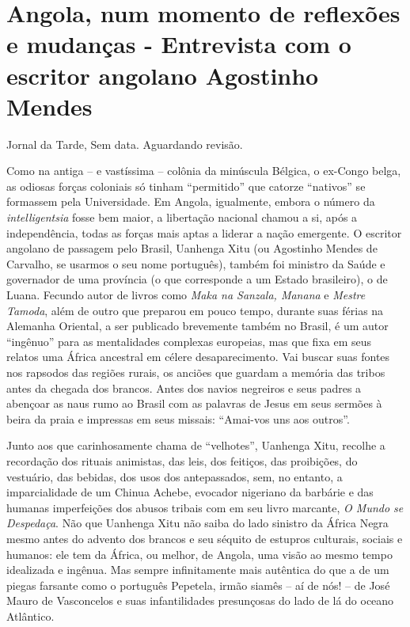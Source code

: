 \documentclass[
  letterpaper,
  DIV=11,
  numbers=noendperiod]{scrreprt}
\begin{document}
\chapter{Angola, num momento de reflexões e mudanças - Entrevista com o
escritor angolano Agostinho
Mendes}\label{angola-num-momento-de-reflexuxf5es-e-mudanuxe7as---entrevista-com-o-escritor-angolano-agostinho-mendes}

Jornal da Tarde, Sem data. Aguardando revisão.

\hfill\break

Como na antiga -- e vastíssima -- colônia da minúscula Bélgica, o
ex-Congo belga, as odiosas forças coloniais só tinham ``permitido'' que
catorze ``nativos'' se formassem pela Universidade. Em Angola,
igualmente, embora o número da \emph{intelligentsia} fosse bem maior, a
libertação nacional chamou a si, após a independência, todas as forças
mais aptas a liderar a nação emergente. O escritor angolano de passagem
pelo Brasil, Uanhenga Xitu (ou Agostinho Mendes de Carvalho, se usarmos
o seu nome português), também foi ministro da Saúde e governador de uma
província (o que corresponde a um Estado brasileiro), o de Luana.
Fecundo autor de livros como \emph{Maka na Sanzala, Manana} e
\emph{Mestre Tamoda}, além de outro que preparou em pouco tempo, durante
suas férias na Alemanha Oriental, a ser publicado brevemente também no
Brasil, é um autor ``ingênuo'' para as mentalidades complexas europeias,
mas que fixa em seus relatos uma África ancestral em célere
desaparecimento. Vai buscar suas fontes nos rapsodos das regiões rurais,
os anciões que guardam a memória das tribos antes da chegada dos
brancos. Antes dos navios negreiros e seus padres a abençoar as naus
rumo ao Brasil com as palavras de Jesus em seus sermões à beira da praia
e impressas em seus missais: ``Amai-vos uns aos outros''.

Junto aos que carinhosamente chama de ``velhotes'', Uanhenga Xitu,
recolhe a recordação dos rituais animistas, das leis, dos feitiços, das
proibições, do vestuário, das bebidas, dos usos dos antepassados, sem,
no entanto, a imparcialidade de um Chinua Achebe, evocador nigeriano da
barbárie e das humanas imperfeições dos abusos tribais com em seu livro
marcante, \emph{O Mundo se Despedaça}. Não que Uanhenga Xitu não saiba
do lado sinistro da África Negra mesmo antes do advento dos brancos e
seu séquito de estupros culturais, sociais e humanos: ele tem da África,
ou melhor, de Angola, uma visão ao mesmo tempo idealizada e ingênua. Mas
sempre infinitamente mais autêntica do que a de um piegas farsante como
o português Pepetela, irmão siamês -- aí de nós! -- de José Mauro de
Vasconcelos e suas infantilidades presunçosas do lado de lá do oceano
Atlântico.
\end{document}
